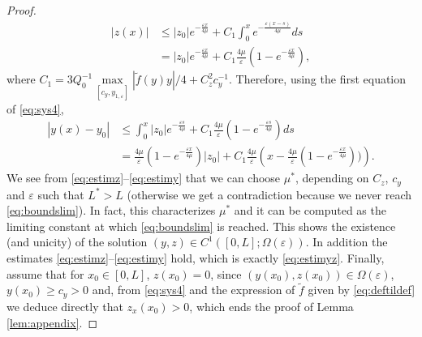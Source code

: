\documentclass[11pt]{article}
\begin{document}
\begin{proof}
\begin{equation}
\label{eq:estimz}
\begin{split}
    |z(x)| &\leq |z_{0}| e^{-\frac{\varepsilon x}{4\mu}}+C_{1}\int_{0}^{x}e^{-\frac{\varepsilon (x-s)}{4\mu}} ds \\&= |z_{0}| e^{-\frac{\varepsilon x}{4\mu}}+ C_{1}\frac{4\mu}{\varepsilon}(1-e^{-\frac{\varepsilon x}{4\mu}}),
\end{split}
\end{equation}
where $C_{1} = 3Q_{0}^{-1}\max\limits_{[c_{y},y_{1,\varepsilon}]}|\tilde{f}(y)y|/4+ C_{z}^{2}c_{y}^{-1}$. 
Therefore, using the first equation of \eqref{eq:sys4},
\begin{equation}
\label{eq:estimy}
\begin{split}
|y(x) - y_{0}| &\leq \int_{0}^{x} |z_{0}| e^{-\frac{\varepsilon s}{4\mu}}+ C_{1}\frac{4\mu}{\varepsilon}(1-e^{-\frac{\varepsilon s}{4\mu}}) ds\\
&= \frac{4\mu}{\varepsilon}\left(1-e^{-\frac{\varepsilon x}{4\mu}}\right)|z_{0}|  + C_{1}\frac{4\mu}{\varepsilon}\left(x-\frac{4\mu}{\varepsilon}(1-e^{-\frac{\varepsilon x}{4\mu}}))\right).
\end{split}
\end{equation}
We see from \eqref{eq:estimz}--\eqref{eq:estimy} that we can choose $\mu^{*}$, depending on $C_{z}$, $c_{y}$ and $\varepsilon$ such that $L^{*}>L$ (otherwise we get a contradiction because we never reach \eqref{eq:boundslim}). {In fact, this characterizes $\mu^{*}$ and it can be computed as the limiting constant at which \eqref{eq:boundslim} is reached.} 
This shows the existence (and unicity) of the solution $(y,z)\in C^{1}([0,L];\Omega(\varepsilon))$. In addition the estimates \eqref{eq:estimz}--\eqref{eq:estimy} hold, {which is exactly \eqref{eq:estimyz}. Finally, assume that for $x_{0}\in[0,L]$, $z(x_{0})=0$, since $(y(x_{0}),z(x_{0}))\in \Omega(\varepsilon)$, $y(x_{0})\geq c_{y}>0$ and, from \eqref{eq:sys4} and the expression of $\tilde{f}$ given by \eqref{eq:deftildef} we deduce directly that $z_{x}(x_{0})>0$,} which ends the proof of Lemma \ref{lem:appendix}.
\end{proof}
\end{document}
